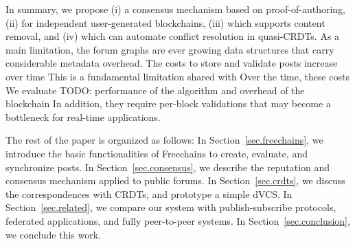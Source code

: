 \documentclass[10pt,journal,compsoc]{IEEEtran}
\newcommand{\FC}       {Freechains\xspace}
\begin{document}
In summary, we propose
    (i)   a consensus mechanism based on proof-of-authoring,
    (ii)  for independent user-generated blockchains,
    (iii) which supports content removal, and
    (iv)  which can automate conflict resolution in quasi-CRDTs.
%
As a main limitation, the forum graphs are ever growing data structures that
carry considerable metadata overhead.
The costs to store and validate posts increase over time
This is a fundamental limitation shared with 
Over the time, these costs
We evaluate
TODO: performance of the algorithm and overhead of the blockchain
In addition, they require per-block validations that may become a bottleneck
for real-time applications.

The rest of the paper is organized as follows:
In Section~\ref{sec.freechains}, we introduce the basic functionalities of \FC
to create, evaluate, and synchronize posts.
In Section~\ref{sec.consensus}, we describe the reputation and consensus
mechanism applied to public forums.
In Section~\ref{sec.crdts}, we discuss the correspondences with CRDTs, and
prototype a simple dVCS.
In Section~\ref{sec.related}, we compare our system with publish-subscribe
protocols, federated applications, and fully peer-to-peer systems.
In Section~\ref{sec.conclusion}, we conclude this work.
\end{document}
